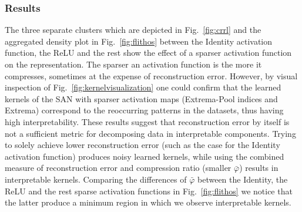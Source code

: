 \documentclass[journal]{IEEEtran}
\begin{document}
\subsubsection{Results}
The three separate clusters which are depicted in Fig.~\ref{fig:crrl} and the aggregated density plot in Fig.~\ref{fig:flithos} between the Identity activation function, the ReLU and the rest show the effect of a sparser activation function on the representation.
The sparser an activation function is the more it compresses, sometimes at the expense of reconstruction error.
However, by visual inspection of Fig.~\ref{fig:kernelvisualization} one could confirm that the learned kernels of the SAN with sparser activation maps (Extrema-Pool indices and Extrema) correspond to the reoccurring patterns in the datasets, thus having high interpretability.
These results suggest that reconstruction error by itself is not a sufficient metric for decomposing data in interpretable components.
Trying to solely achieve lower reconstruction error (such as the case for the Identity activation function) produces noisy learned kernels, while using the combined measure of reconstruction error and compression ratio (smaller $\bar\varphi$) results in interpretable kernels.
Comparing the differences of $\bar\varphi$ between the Identity, the ReLU and the rest sparse activation functions in Fig.~\ref{fig:flithos} we notice that the latter produce a minimum region in which we observe interpretable kernels.
\end{document}
